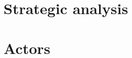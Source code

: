 \documentclass{article}
\begin{document}
\section{Strategic analysis}

\lipsum[1]

\section{Actors}

\lipsum[2]
\end{document}
